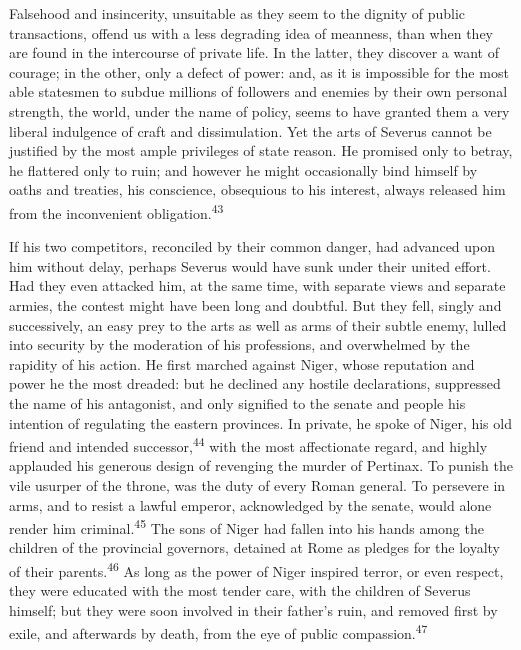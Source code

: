 
Falsehood and insincerity, unsuitable as they seem to the dignity
of public transactions, offend us with a less degrading idea of
meanness, than when they are found in the intercourse of private
life. In the latter, they discover a want of courage; in the
other, only a defect of power: and, as it is impossible for the
most able statesmen to subdue millions of followers and enemies
by their own personal strength, the world, under the name of
policy, seems to have granted them a very liberal indulgence of
craft and dissimulation. Yet the arts of Severus cannot be
justified by the most ample privileges of state reason. He
promised only to betray, he flattered only to ruin; and however
he might occasionally bind himself by oaths and treaties, his
conscience, obsequious to his interest, always released him from
the inconvenient obligation.\textsuperscript{43}


If his two competitors, reconciled by their common danger, had
advanced upon him without delay, perhaps Severus would have sunk
under their united effort. Had they even attacked him, at the
same time, with separate views and separate armies, the contest
might have been long and doubtful. But they fell, singly and
successively, an easy prey to the arts as well as arms of their
subtle enemy, lulled into security by the moderation of his
professions, and overwhelmed by the rapidity of his action. He
first marched against Niger, whose reputation and power he the
most dreaded: but he declined any hostile declarations,
suppressed the name of his antagonist, and only signified to the
senate and people his intention of regulating the eastern
provinces. In private, he spoke of Niger, his old friend and
intended successor,\textsuperscript{44} with the most affectionate regard, and
highly applauded his generous design of revenging the murder of
Pertinax. To punish the vile usurper of the throne, was the duty
of every Roman general. To persevere in arms, and to resist a
lawful emperor, acknowledged by the senate, would alone render
him criminal.\textsuperscript{45} The sons of Niger had fallen into his hands
among the children of the provincial governors, detained at Rome
as pledges for the loyalty of their parents.\textsuperscript{46} As long as the
power of Niger inspired terror, or even respect, they were
educated with the most tender care, with the children of Severus
himself; but they were soon involved in their father’s ruin, and
removed first by exile, and afterwards by death, from the eye of
public compassion.\textsuperscript{47}

